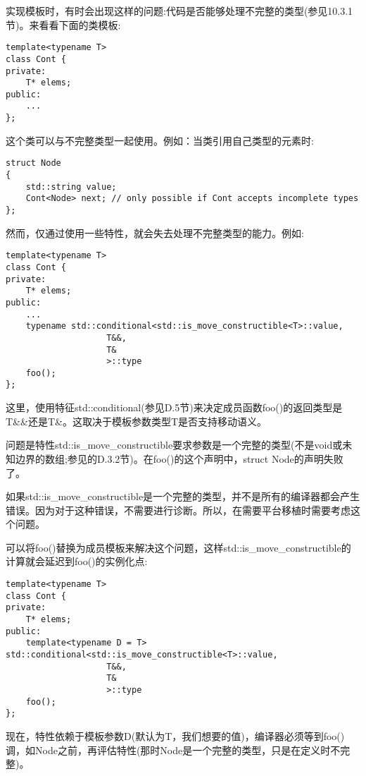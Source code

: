 实现模板时，有时会出现这样的问题:代码是否能够处理不完整的类型(参见10.3.1节)。来看看下面的类模板:

\begin{lstlisting}[style=styleCXX]
template<typename T>
class Cont {
private:
	T* elems;
public:
	...
};
\end{lstlisting}

这个类可以与不完整类型一起使用。例如：当类引用自己类型的元素时:

\begin{lstlisting}[style=styleCXX]
struct Node
{
	std::string value;
	Cont<Node> next; // only possible if Cont accepts incomplete types
};
\end{lstlisting}

然而，仅通过使用一些特性，就会失去处理不完整类型的能力。例如:

\begin{lstlisting}[style=styleCXX]
template<typename T>
class Cont {
private:
	T* elems;
public:
	...
	typename std::conditional<std::is_move_constructible<T>::value,
					T&&,
					T&
					>::type
	foo();
};
\end{lstlisting}

这里，使用特征std::conditional(参见D.5节)来决定成员函数foo()的返回类型是T\&\&还是T\&。这取决于模板参数类型T是否支持移动语义。

问题是特性std::is\_move\_constructible要求参数是一个完整的类型(不是void或未知边界的数组;参见的D.3.2节)。在foo()的这个声明中，struct Node的声明失败了。

\begin{tcolorbox}[colback=webgreen!5!white,colframe=webgreen!75!black]
\hspace*{0.75cm}如果std::is\_move\_constructible是一个完整的类型，并不是所有的编译器都会产生错误。因为对于这种错误，不需要进行诊断。所以，在需要平台移植时需要考虑这个问题。
\end{tcolorbox}

可以将foo()替换为成员模板来解决这个问题，这样std::is\_move\_constructible的计算就会延迟到foo()的实例化点:

\begin{lstlisting}[style=styleCXX]
template<typename T>
class Cont {
private:
	T* elems;
public:
	template<typename D = T> std::conditional<std::is_move_constructible<T>::value,
					T&&,
					T&
					>::type
	foo();
};
\end{lstlisting}

现在，特性依赖于模板参数D(默认为T，我们想要的值)，编译器必须等到foo()调，如Node之前，再评估特性(那时Node是一个完整的类型，只是在定义时不完整)。











